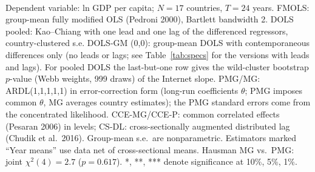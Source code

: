 \\[3pt]\begin{minipage}{\tablewidth}\footnotesize Dependent variable: ln GDP per capita; $N=17$ countries, $T=24$ years. FMOLS: group-mean fully modified OLS (Pedroni 2000), Bartlett bandwidth 2. DOLS pooled: Kao--Chiang with one lead and one lag of the differenced regressors, country-clustered s.e. DOLS-GM (0,0): group-mean DOLS with contemporaneous differences only (no leads or lags; see Table~\ref{tab:specs} for the versions with leads and lags). For pooled DOLS the last-but-one row gives the wild-cluster bootstrap $p$-value (Webb weights, 999 draws) of the Internet slope. PMG/MG: ARDL(1,1,1,1,1) in error-correction form (long-run coefficients $\theta$; PMG imposes common $\theta$, MG averages country estimates); the PMG standard errors come from the concentrated likelihood. CCE-MG/CCE-P: common correlated effects (Pesaran 2006) in levels; CS-DL: cross-sectionally augmented distributed lag (Chudik et al.\ 2016). Group-mean s.e.\ are nonparametric. Estimators marked ``Year means'' use data net of cross-sectional means. Hausman MG vs.\ PMG: joint $\chi^2(4)=2.7$ ($p=0.617$). *, **, *** denote significance at 10\%, 5\%, 1\%.\end{minipage}
